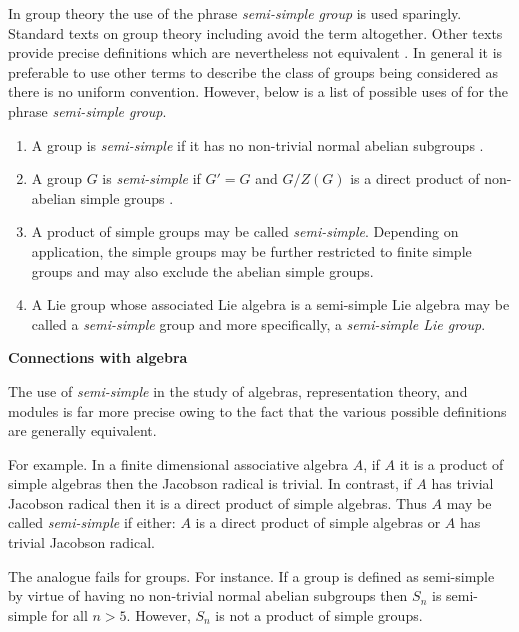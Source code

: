 \documentclass[12pt]{article}
\begin{document}
In group theory the use of the phrase \emph{semi-simple group} is used sparingly.
Standard texts on group theory including \cite{Aschbacher, Gorenstein} avoid
the term altogether.  Other texts provide precise definitions which are nevertheless 
not equivalent \cite{Robinson, Suzuki}.  In general it is preferable to use 
other terms to describe the class of groups being considered as there is 
no uniform convention.  However, below is a list of possible uses of for
the phrase \emph{semi-simple group}.

\begin{enumerate}
\item A group is \emph{semi-simple} if it has no non-trivial normal abelian 
subgroups \cite[p. 89]{Robinson}.

\item A group $G$ is \emph{semi-simple} if $G'=G$ and $G/Z(G)$ is a direct 
product of non-abelian simple groups \cite[Def. 6.1]{Suzuki}.

\item A product of simple groups may be called \emph{semi-simple}.  Depending
on application, the simple groups may be further restricted to finite simple groups
and may also exclude the abelian simple groups.

\item A Lie group whose associated Lie algebra is a semi-simple Lie algebra may
be called a \emph{semi-simple} group and more specifically, a 
\emph{semi-simple Lie group}.
\end{enumerate}


\textbf{Connections with algebra}

The use of \emph{semi-simple} in the study of algebras, representation theory, and modules
is far more precise owing to the fact that the various possible definitions are generally 
equivalent.

For example.  In a finite dimensional associative algebra $A$, if $A$ it is a product of 
simple algebras then the Jacobson radical is trivial.  In contrast, if $A$ has trivial
Jacobson radical then it is a direct product of simple algebras.  Thus $A$ may be 
called \emph{semi-simple} if either: $A$ is a direct product of simple algebras or
$A$ has trivial Jacobson radical.


The analogue fails for groups.  For instance.  If a group is defined as semi-simple
by virtue of having no non-trivial normal abelian subgroups then $S_n$ is semi-simple
for all $n>5$.  However, $S_n$ is not a product of simple groups.
\end{document}
